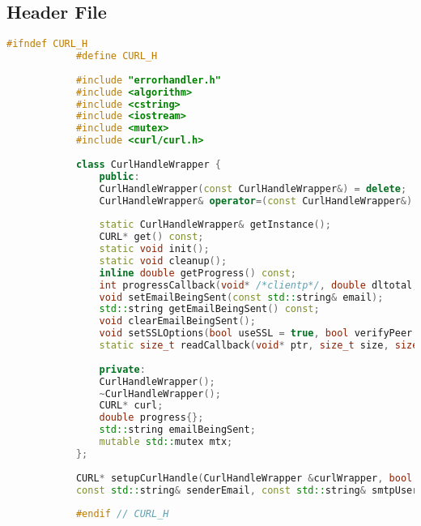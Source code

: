 \documentclass{article}
\begin{document}
	\subsection*{Header File}
	\begin{mdframed}[backgroundcolor=background, hidealllines=false, innerleftmargin=15pt, innerrightmargin=5pt, innertopmargin=0pt, innerbottommargin=-5pt, linecolor=accent]
		\begin{lstlisting}[language=C++]
			#ifndef CURL_H
			#define CURL_H
			
			#include "errorhandler.h"
			#include <algorithm>
			#include <cstring>
			#include <iostream>
			#include <mutex>
			#include <curl/curl.h>
			
			class CurlHandleWrapper {
				public:
				CurlHandleWrapper(const CurlHandleWrapper&) = delete;
				CurlHandleWrapper& operator=(const CurlHandleWrapper&) = delete;
				
				static CurlHandleWrapper& getInstance();
				CURL* get() const;
				static void init();
				static void cleanup();
				inline double getProgress() const;
				int progressCallback(void* /*clientp*/, double dltotal, double dlnow, double /*ultotal*/, double /*ulnow*/);
				void setEmailBeingSent(const std::string& email);
				std::string getEmailBeingSent() const;
				void clearEmailBeingSent();
				void setSSLOptions(bool useSSL = true, bool verifyPeer = true, bool verifyHost = true);
				static size_t readCallback(void* ptr, size_t size, size_t nmemb, void* userp);
				
				private:
				CurlHandleWrapper();
				~CurlHandleWrapper();
				CURL* curl;
				double progress{};
				std::string emailBeingSent;
				mutable std::mutex mtx;
			};
			
			CURL* setupCurlHandle(CurlHandleWrapper &curlWrapper, bool useSSL, bool verifyPeer, bool verifyHost, bool verbose,
			const std::string& senderEmail, const std::string& smtpUsername, std::string& mailPassDecrypted, int smtpPort, const std::string& smtpServer);
			
			#endif // CURL_H
		\end{lstlisting}
	\end{mdframed}
	
\end{document}
